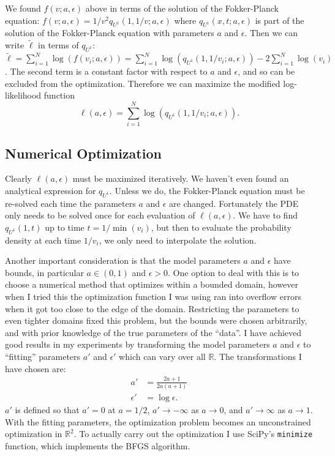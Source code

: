 \documentclass{article}
\def\R{\mathbb{R}}
\begin{document}
We found $f(v; a, \epsilon)$ above in terms of the solution of the
Fokker-Planck equation: $f(v; a, \epsilon) = 1/v^2 q_{U^1}(1, 1/v; a,
\epsilon)$ where $q_{U^1}(x, t; a, \epsilon)$ is part of the solution
of the Fokker-Planck equation with parameters $a$ and $\epsilon$. Then
we can write $\tilde{\ell}$ in terms of $q_{U^1}$:
$\tilde{\ell} = \sum_{i=1}^N \log(f(v_i; a, \epsilon)) = \sum_{i=1}^N
\log(q_{U^1}(1, 1/v_i; a, \epsilon)) - 2\sum_{i=1}^N \log(v_i)$. The
second term is a constant factor with respect to $a$ and $\epsilon$,
and so can be excluded from the optimization. Therefore we can
maximize the modified log-likelihood function
\begin{equation}
  \label{eq:mod-log-like}
  \ell(a, \epsilon) = \sum_{i=1}^N \log(q_{U^1}(1, 1/v_i; a, \epsilon)).
\end{equation}

\subsection{Numerical Optimization}
\label{sec:numer-optim}

Clearly $\ell(a, \epsilon)$ must be maximized iteratively. We haven't
even found an analytical expression for $q_{U^1}$. Unless we do, the
Fokker-Planck equation must be re-solved each time the parameters $a$
and $\epsilon$ are changed. Fortunately the PDE only needs to be
solved once for each evaluation of $\ell(a, \epsilon)$. We have to
find $q_{U^1}(1, t)$ up to time $t = 1/\min(v_i)$, but then to
evaluate the probability density at each time $1/v_i$, we only need to
interpolate the solution.

Another important consideration is that the model parameters $a$ and
$\epsilon$ have bounds, in particular $a \in (0, 1)$ and
$\epsilon > 0$. One option to deal with this is to choose a numerical
method that optimizes within a bounded domain, however when I tried
this the optimization function I was using ran into overflow errors
when it got too close to the edge of the domain. Restricting the
parameters to even tighter domains fixed this problem, but the bounds
were chosen arbitrarily, and with prior knowledge of the true
parameters of the ``data''. I have achieved good results in my
experiments by transforming the model parameters $a$ and $\epsilon$ to
``fitting'' parameters $a'$ and $\epsilon'$ which can vary over all
$\R$. The transformations I have chosen are:
\begin{align}
  \label{eq:a-fwd-trns}
  a' &= \frac{2a + 1}{2a(a + 1)} \\
  \label{eq:e-fwd-trns}
  \epsilon' &= \log \epsilon.
\end{align}
$a'$ is defined so that $a'=0$ at $a=1/2$, $a' \rightarrow -\infty$ as
$a \rightarrow 0$, and $a' \rightarrow \infty$ as $a \rightarrow
1$. With the fitting parameters, the optimization problem becomes an
unconstrained optimization in $\R^2$. To actually carry out the
optimization I use SciPy's \verb|minimize| function, which implements
the BFGS algorithm.
\end{document}
